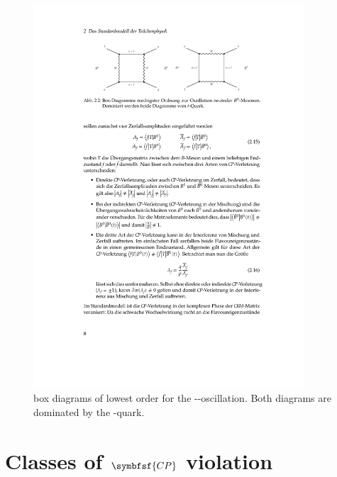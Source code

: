 \begin{figure}[tbp]
	\centering
	\includegraphics[width=0.9\textwidth]{03CPV/figs/FeynmanMixing.pdf}
	\caption{box diagrams of lowest order for the \Bz-\Bzb-oscillation. Both diagrams are dominated by the \tquark-quark.}
	\label{fig:FeynmanMixing}
\end{figure}

\section[head={Types of \CP violation},tocentry={Classes of \CP violation}]{Classes of $\symbfsf{C{}P}$ violation}
\label{sec:CPVClasses}

